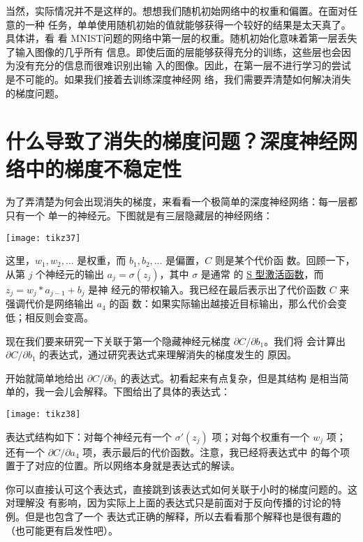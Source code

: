 当然，实际情况并不是这样的。想想我们随机初始网络中的权重和偏置。在面对任意的一种
任务，单单使用随机初始的值就能够获得一个较好的结果是太天真了。具体讲，看
看 MNIST问题的网络中第一层的权重。随机初始化意味着第一层丢失了输入图像的几乎所有
信息。即使后面的层能够获得充分的训练，这些层也会因为没有充分的信息而很难识别出输
入的图像。因此，在第一层不进行学习的尝试是不可能的。如果我们接着去训练深度神经网
络，我们需要弄清楚如何解决消失的梯度问题。

\section{什么导致了消失的梯度问题？深度神经网络中的梯度不稳定性}
\label{sec:what_is_causing_the_vanishing_gradient_problem_unstable_gradients_in_deep_neural_nets}

为了弄清楚为何会出现消失的梯度，来看看一个极简单的深度神经网络：每一层都只有一个
单一的神经元。下图就是有三层隐藏层的神经网络：
\begin{center}
  \texttt{[image: tikz37]}
\end{center}

这里，$w_1, w_2, \ldots$ 是权重，而 $b_1, b_2, \ldots$ 是偏置，$C$ 则是某个代价函
数。回顾一下，从第 $j$ 个神经元的输出 $a_j = \sigma(z_j)$，其中 $\sigma$ 是通常
的 \hyperref[sigmoid_neurons]{S 型激活函数}，而 $z_j = w_j * a_{j-1} + b_j$ 是神
经元的带权输入。我已经在最后表示出了代价函数 $C$ 来强调代价是网络输出 $a_4$ 的函
数：如果实际输出越接近目标输出，那么代价会变低；相反则会变高。
 
现在我们要来研究一下关联于第一个隐藏神经元梯度 $\partial C/\partial b_1$。我们将
会计算出 $\partial C/\partial b_1$ 的表达式，通过研究表达式来理解消失的梯度发生的
原因。
 
开始就简单地给出 $\partial C/\partial b_1$ 的表达式。初看起来有点复杂，但是其结构
是相当简单的，我一会儿会解释。下图给出了具体的表达式：
\begin{center}
  \texttt{[image: tikz38]}
\end{center}

表达式结构如下：对每个神经元有一个 $\sigma'(z_j)$ 项；对每个权重有一个 $w_j$ 项；
还有一个 $\partial C/\partial a_4$ 项，表示最后的代价函数。注意，我已经将表达式中
的每个项置于了对应的位置。所以网络本身就是表达式的解读。
 
你可以直接认可这个表达式，直接跳到该表达式如何关联于小时的梯度问题的。这对理解没
有影响，因为实际上上面的表达式只是前面对于反向传播的讨论的特例。但是也包含了一个
表达式正确的解释，所以去看看那个解释也是很有趣的（也可能更有启发性吧）。
 
